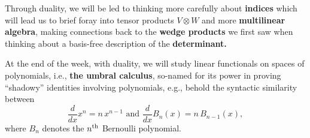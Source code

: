 \documentclass{homework}
\begin{document}
Through duality, we will be led to thinking more carefully about
\textbf{indices} which will lead us to brief foray into tensor
products $V \otimes W$ and more \textbf{multilinear algebra}, making
connections back to the \textbf{wedge products} we first saw when
thinking about a basis-free description of the \textbf{determinant.}

At the end of the week, with duality, we will study linear functionals
on spaces of polynomials, i.e., \textbf{the umbral calculus}, so-named
for its power in proving ``shadowy'' identities involving polynomials, e.g.,
behold the syntactic similarity between
\[
 \frac {d}{dx} x^{n}=n\,x^{n-1} \mbox{ and } {\frac {d}{dx}}B_{n}(x)=n \, B_{n-1}(x),
\]
where $B_n$ denotes the $n^{\mbox{\scriptsize th}}$ Bernoulli polynomial.
\end{document}
